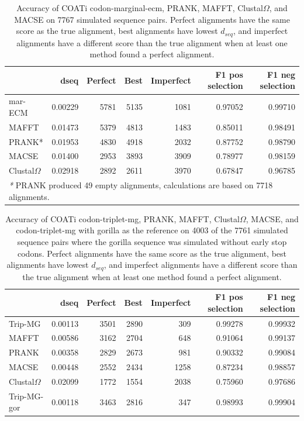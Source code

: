 \begin{table}[H]
\begin{tabular}[t]{l|r|r|r|r|r|r}
\hline
  & dseq & Perfect & Best & Imperfect & F1 pos selection & F1 neg selection\\
\hline
mar-ECM & 0.00229 & 5781 & 5135 & 1081 & 0.97052 & 0.99710\\
\hline
MAFFT & 0.01473 & 5379 & 4813 & 1483 & 0.85011 & 0.98491\\
\hline
PRANK* & 0.01953 & 4830 & 4918 & 2032 & 0.87752 & 0.98790\\
\hline
MACSE & 0.01400 & 2953 & 3893 & 3909 & 0.78977 & 0.98159\\
\hline
Clustal$\Omega$ & 0.02918 & 2892 & 2611 & 3970 & 0.67847 & 0.96785\\
\hline
\multicolumn{7}{l}{\rule{0pt}{1em}\textit{*} PRANK produced 49 empty alignments, calculations are based on 7718 alignments.}\\
\end{tabular}
\caption[COATi Marginal-ECM Benchmark Results]{Accuracy of COATi codon-marginal-ecm, PRANK, MAFFT, Clustal$\Omega$, and MACSE on 7767 simulated sequence pairs. Perfect alignments have the same score as the true alignment, best alignments have lowest $d_{seq}$, and imperfect alignments have a different score than the true alignment when at least one method found a perfect alignment.}
\label{table:results-mar-ecm}
\centering
\end{table}

\begin{table}[H]
\centering
\begin{tabular}[t]{l|r|r|r|r|r|r}
\hline
  & dseq & Perfect & Best & Imperfect & F1 pos selection & F1 neg selection\\
\hline
Trip-MG & 0.00113 & 3501 & 2890 & 309 & 0.99278 & 0.99932\\
\hline
MAFFT & 0.00586 & 3162 & 2704 & 648 & 0.91064 & 0.99137\\
\hline
PRANK & 0.00358 & 2829 & 2673 & 981 & 0.90332 & 0.99084\\
\hline
MACSE & 0.00448 & 2552 & 2434 & 1258 & 0.87234 & 0.98857\\
\hline
Clustal$\Omega$ & 0.02099 & 1772 & 1554 & 2038 & 0.75960 & 0.97686\\
\hline
Trip-MG-gor & 0.00118 & 3463 & 2816 & 347 & 0.98993 & 0.99904\\
\hline
\end{tabular}
\caption[COATi Marginal-MG Benchmark Results with Gorilla as Reference]{Accuracy of COATi codon-triplet-mg, PRANK, MAFFT, Clustal$\Omega$, MACSE, and codon-triplet-mg with gorilla as the reference on 4003 of the 7761 simulated sequence pairs where the gorilla sequence was simulated without early stop codons. Perfect alignments have the same score as the true alignment, best alignments have lowest $d_{seq}$, and imperfect alignments have a different score than the true alignment when at least one method found a perfect alignment.}
\label{table:results-gor-ref}
\end{table}

